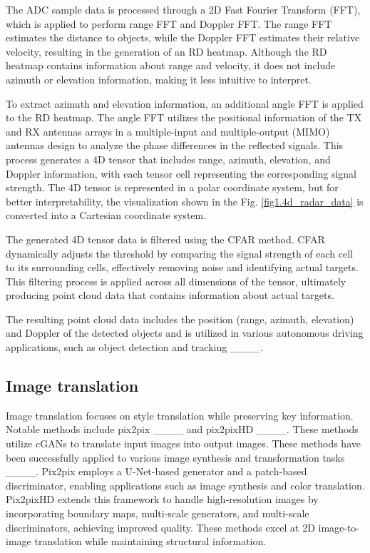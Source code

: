 The ADC sample data is processed through a 2D Fast Fourier Transform (FFT), which is applied to perform range FFT and Doppler FFT. The range FFT estimates the distance to objects, while the Doppler FFT estimates their relative velocity, resulting in the generation of an RD heatmap. Although the RD heatmap contains information about range and velocity, it does not include azimuth or elevation information, making it less intuitive to interpret.

To extract azimuth and elevation information, an additional angle FFT is applied to the RD heatmap. The angle FFT utilizes the positional information of the TX and RX antennas arrays in a multiple-input and multiple-output (MIMO) antennas design to analyze the phase differences in the reflected signals. This process generates a 4D tensor that includes range, azimuth, elevation, and Doppler information, with each tensor cell representing the corresponding signal strength. The 4D tensor is represented in a polar coordinate system, but for better interpretability, the visualization shown in the Fig. \ref{fig1.4d_radar_data} is converted into a Cartesian coordinate system.

The generated 4D tensor data is filtered using the CFAR method. CFAR dynamically adjusts the threshold by comparing the signal strength of each cell to its surrounding cells, effectively removing noise and identifying actual targets. This filtering process is applied across all dimensions of the tensor, ultimately producing point cloud data that contains information about actual targets.

The resulting point cloud data includes the position (range, azimuth, elevation) and Doppler of the detected objects and is utilized in various autonomous driving applications, such as object detection and tracking ____.

\subsection{Image translation}

Image translation focuses on style translation while preserving key information. Notable methods include pix2pix ____ and pix2pixHD ____. These methods utilize cGANs to translate input images into output images. These methods have been successfully applied to various image synthesis and transformation tasks ____. Pix2pix employs a U-Net-based generator and a patch-based discriminator, enabling applications such as image synthesis and color translation. Pix2pixHD extends this framework to handle high-resolution images by incorporating boundary maps, multi-scale generators, and multi-scale discriminators, achieving improved quality. These methods excel at 2D image-to-image translation while maintaining structural information.

